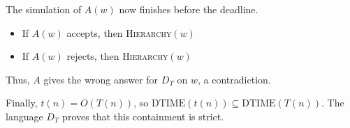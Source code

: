 \documentclass[11  pt]{article}
\begin{document}
The simulation of $A(w)$ now finishes before the deadline.
\begin{itemize}
    \item If $A(w)$ accepts, then \textsc{Hierarchy}$(w)$ 
    \item If $A(w)$ rejects, then \textsc{Hierarchy}$(w)$ 
\end{itemize}
Thus, $A$ gives the wrong answer for $D_T$ on $w$, a contradiction.

\vfill
Finally, $t(n)=O(T(n))$, so $\mathrm{DTIME}(t(n))\subseteq\mathrm{DTIME}(T(n))$. The language $D_T$ proves that this containment is strict.
\end{document}
